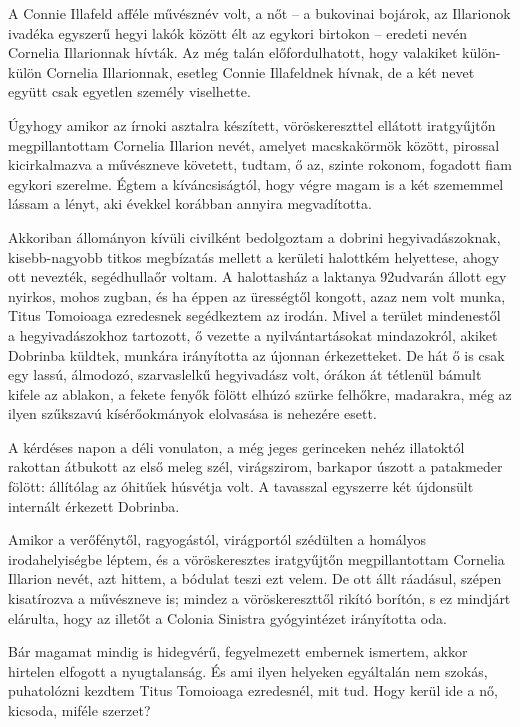 \documentclass{IEEEtran}
\begin{document}
A Connie Illafeld afféle művésznév volt, a nőt – a bukovinai bojárok, az
Illarionok ivadéka egyszerű hegyi lakók között élt az egykori birtokon –
eredeti nevén Cornelia Illarionnak hívták. Az még talán előfordulhatott, hogy
valakiket külön-külön Cornelia Illarionnak, esetleg Connie Illafeldnek hívnak,
de a két nevet együtt csak egyetlen személy viselhette.

Úgyhogy amikor az írnoki asztalra készített, vöröskereszttel ellátott
iratgyűjtőn megpillantottam Cornelia Illarion nevét, amelyet macskakörmök
között, pirossal kicirkalmazva a művészneve követett, tudtam, ő az, szinte
rokonom, fogadott fiam egykori szerelme. Égtem a kíváncsiságtól, hogy végre
magam is a két szememmel lássam a lényt, aki évekkel korábban annyira
megvadította.

Akkoriban állományon kívüli civilként bedolgoztam a dobrini hegyivadászoknak,
kisebb-nagyobb titkos megbízatás mellett a kerületi halottkém helyettese,
ahogy ott nevezték, segédhullaőr voltam. A halottasház a laktanya 92udvarán
állott egy nyirkos, mohos zugban, és ha éppen az ürességtől kongott, azaz nem
volt munka, Titus Tomoioaga ezredesnek segédkeztem az irodán. Mivel a terület
mindenestől a hegyivadászokhoz tartozott, ő vezette a nyilvántartásokat
mindazokról, akiket Dobrinba küldtek, munkára irányította az újonnan
érkezetteket. De hát ő is csak egy lassú, álmodozó, szarvaslelkű hegyivadász
volt, órákon át tétlenül bámult kifele az ablakon, a fekete fenyők fölött
elhúzó szürke felhőkre, madarakra, még az ilyen szűkszavú kísérőokmányok
elolvasása is nehezére esett.

A kérdéses napon a déli vonulaton, a még jeges gerinceken nehéz illatoktól
rakottan átbukott az első meleg szél, virágszirom, barkapor úszott a
patakmeder fölött: állítólag az óhitűek húsvétja volt. A tavasszal egyszerre
két újdonsült internált érkezett Dobrinba.

Amikor a verőfénytől, ragyogástól, virágportól szédülten a homályos
irodahelyiségbe léptem, és a vöröskeresztes iratgyűjtőn megpillantottam
Cornelia Illarion nevét, azt hittem, a bódulat teszi ezt velem. De ott állt
ráadásul, szépen kisatírozva a művészneve is; mindez a vöröskereszttől rikító
borítón, s ez mindjárt elárulta, hogy az illetőt a Colonia Sinistra
gyógyintézet irányította oda.

Bár magamat mindig is hidegvérű, fegyelmezett embernek ismertem, akkor
hirtelen elfogott a nyugtalanság. És ami ilyen helyeken egyáltalán nem szokás,
puhatolózni kezdtem Titus Tomoioaga ezredesnél, mit tud. Hogy kerül ide a nő,
kicsoda, miféle szerzet?
\end{document}
